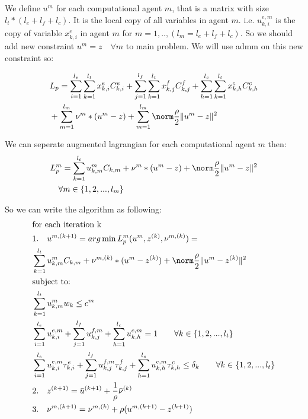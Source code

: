 \documentclass[conference]{IEEEtran}
\begin{document}
    We define $u^m$ for each computational agent $m$, that is a matrix with size $l_t*(l_e+l_f+l_c)$.
    It is the local copy of all variables in agent $m$. i.e. $u_{k,i}^{e,m}$ is the copy of variable $x_{k,i}^e$
    in agent $m$ for $m=1,..,(l_m = l_e+l_f+l_c)$. So we should add new constraint $u^m = z \quad \forall m$ to main problem.
    We will use admm on this new constraint so:

    \begin{subequations}
      \begin{align}
        &L_p = \sum_{i=1}^{l_e} \sum_{k=1}^{l_t} x_{k,i}^e C_{k,i}^e
        +\sum_{j=1}^{l_f} \sum_{k=1}^{l_t} x_{k,j}^f C_{k,j}^f
        +\sum_{h=1}^{l_c} \sum_{k=1}^{l_t} x_{k,h}^c C_{k,h}^c \\ \notag
        &+\sum_{m=1}^{l_m} \nu^m*(u^m-z) + \sum_{m=1}^{l_m} \norm\frac{\rho}{2} \|u^m-z\|^2
      \end{align}
    \end{subequations}

    We can seperate augmented lagrangian for each computational agent $m$ then:
    \begin{subequations}
      \begin{align}
        &L_p^m = \sum_{k=1}^{l_t} u_{k,m}^{m} C_{k,m}
        + \nu^m*(u^m-z) + \norm\frac{\rho}{2} \|u^m-z\|^2 \\ \notag
        &\quad \forall m\in\{1,2,...,l_m\}
      \end{align}
    \end{subequations}

    So we can write the algorithm as following:
    \begin{subequations}
      \begin{align}
        &\text{for each iteration k} \\ \notag
        &\text{1.\quad}u^{m,(k+1)} = arg \min {L_p^m(u^{m}, z^{(k)}, \nu^{m,(k)})} = \\ \notag
        &\sum_{k=1}^{l_t} u_{k,m}^{m} C_{k,m}
        + \nu^{m,(k)}*(u^m-z^{(k)}) + \norm\frac{\rho}{2} \|u^m-z^{(k)}\|^2 \\ \notag
        &\text{subject to:} \\ \notag
        &\sum_{k=1}^{l_t}{u_{k,m}^m w_k} \le c^m \\ \notag
        &\sum_{i=1}^{l_e}u_{k,i}^{e,m}+\sum_{j=1}^{l_f}u_{k,j}^{f,m}+\sum_{h=1}^{l_c}u_{k,h}^{c,m}=1 \quad\quad \forall k\in\{1,2,...,l_t\} \\ \notag
        &\sum_{i=1}^{l_e}u_{k,i}^{e,m}\tau_{k,i}^e
        +\sum_{j=1}^{l_f}u_{k,j}^{f,m}\tau_{k,j}^f
        +\sum_{h=1}^{l_c}u_{k,h}^{c,m}\tau_{k,h}^c
        \le \delta_k \quad\quad \forall k\in\{1,2,...,l_t\} \\ \notag
        &\text{2.\quad}{z}^{(k+1)} = \bar{u}^{(k+1)} + \frac{1}{\rho}\bar{\nu}^{(k)} \\ \notag
        &\text{3.\quad}{\nu}^{m,(k+1)} = \nu^{m,(k)} + \rho(u^{m,(k+1)} - z^{(k+1)})
      \end{align}
    \end{subequations}
\end{document}
